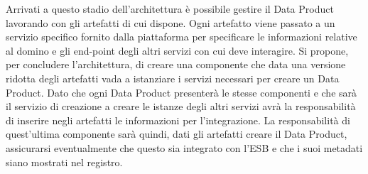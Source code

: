 \documentclass[12pt]{report}
\begin{document}
Arrivati a questo stadio dell'architettura è possibile gestire il Data Product lavorando con gli artefatti di cui dispone.
Ogni artefatto viene passato a un servizio specifico fornito dalla piattaforma per specificare le informazioni relative al domino e gli end-point degli altri servizi con cui deve interagire.
Si propone, per concludere l'architettura, di creare una componente che data una versione ridotta degli artefatti vada a istanziare i servizi necessari per creare un Data Product.
Dato che ogni Data Product presenterà le stesse componenti e che sarà il servizio di creazione a creare le istanze degli altri servizi avrà la responsabilità di inserire negli artefatti le informazioni per l'integrazione.
La responsabilità di quest'ultima componente sarà quindi, dati gli artefatti creare il Data Product, assicurarsi eventualmente che questo sia integrato con l'ESB e che i suoi metadati siano mostrati nel registro.
\end{document}
